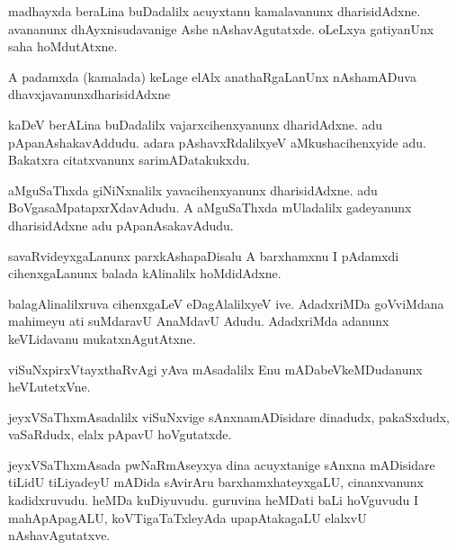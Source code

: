 \documentclass{article}
\begin{document}
\begin{mn}%
madhayxda beraLina buDadalilx acuyxtanu kamalavanunx dharisidAdxne. avananunx 
dhAyxnisudavanige Ashe nAshavAgutatxde. oLeLxya gatiyanUnx saha hoMdutAtxne.
\end{mn}

\begin{mn}%
A padamxda (kamalada) keLage elAlx anathaRgaLanUnx nAshamADuva dhavxjavanunxdharisidAdxne
\end{mn}

\begin{mn}%
kaDeV berALina buDadalilx vajarxcihenxyanunx dharidAdxne. adu pApanAshakavAddudu. adara 
pAshavxRdalilxyeV aMkushacihenxyide adu. Bakatxra citatxvanunx sarimADatakukxdu.
\end{mn}

\begin{mn}%
aMguSaThxda giNiNxnalilx yavacihenxyanunx dharisidAdxne. adu BoVgasaMpatapxrXdavAdudu. A 
aMguSaThxda mUladalilx gadeyanunx dharisidAdxne adu pApanAsakavAdudu.
\end{mn}

\begin{mn}%
savaRvideyxgaLanunx parxkAshapaDisalu A barxhamxnu I pAdamxdi cihenxgaLanunx balada 
kAlinalilx hoMdidAdxne.
\end{mn}

\begin{mn}%
balagAlinalilxruva cihenxgaLeV eDagAlalilxyeV ive. AdadxriMDa goVviMdana mahimeyu ati 
suMdaravU AnaMdavU Adudu. AdadxriMda adanunx keVLidavanu mukatxnAgutAtxne.
\end{mn}

\begin{mn}%
viSuNxpirxVtayxthaRvAgi yAva mAsadalilx Enu mADabeVkeMDudanunx heVLutetxVne.
\end{mn}

\begin{mn}%
jeyxVSaThxmAsadalilx viSuNxvige sAnxnamADisidare dinadudx, pakaSxdudx, vaSaRdudx, elalx 
pApavU hoVgutatxde.
\end{mn}

\begin{mn}%
jeyxVSaThxmAsada pwNaRmAseyxya dina acuyxtanige sAnxna mADisidare tiLidU tiLiyadeyU mADida 
sAvirAru barxhamxhateyxgaLU, cinanxvanunx kadidxruvudu. heMDa kuDiyuvudu. guruvina 
heMDati baLi hoVguvudu I mahApApagALU, koVTigaTaTxleyAda upapAtakagaLU elalxvU 
nAshavAgutatxve.
\end{mn}
\end{document}
